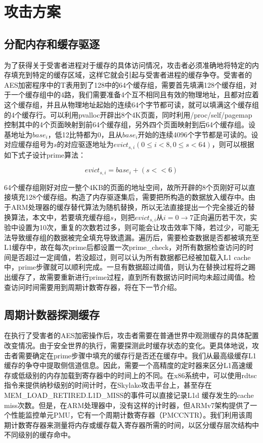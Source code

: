 \chapter{攻击方案}

\section{分配内存和缓存驱逐}
为了获得关于受害者进程对于缓存的具体访问情况，攻击者必须准确地将特定的内存填充到特定的缓存区域，这样它就会引起与受害者进程的缓存争夺。受害者的AES加密程序中的T表用到了128中的64个缓存组，需要首先填满128个缓存组，对于一个缓存组中的4路，我们需要准备4个互不相同且有效的物理地址，且都对应着这个缓存组，并且从物理地址起始的连续64个字节都可读，就可以填满这个缓存组的4个缓存行。可以利用pvalloc开辟出8个4K页面，同时利用/proc/self/pagemap控制其中的4个页面映射到前64个缓存组，另外四个页面映射到后64个缓存组。设基地址为$bas{e_i}$，低12比特都为0，且从$bas{e_i}$开始的连续4096个字节都是可读的。设对应缓存组号为$s$的对应驱逐地址为$evic{t_{s,i}}\left( {0 \le i < 8,0 \le s < 64} \right)$，则可以根据如下式子设计prime算法：

\begin{equation}
	evic{t_{s,i}} = bas{e_i} + \left( {s <  < 6} \right)
\end{equation}

64个缓存组刚好对应一整个4KB的页面的地址空间，故所开辟的8个页刚好可以直接填充128个缓存组。构造了内存驱逐集后，需要把所构造的数据放入缓存中。由于ARM处理器的缓存替代算法为随机替换，所以无法直接提出一个完全接近的替换算法，本文中，若要填充缓存组$s$，则把$evic{t_{s,i}}$从$i = 0\to 7$正向遍历若干次，实验中设置为10次，重复的次数若过多，则可能会让攻击效率下降，若过少，可能无法导致缓存组的数据被完全填充导致遗漏。遍历后，需要检查数据是否都被填充至L1缓存中，故在每次prime后都设置一次prime\_check，对所有数据检查访问的时间是否超过一定阈值，若没超过，则可以认为所有数据都已经被加载入L1 cache中，prime步骤就可以顺利完成。一旦有数据超过阈值，则认为在替换过程将之踢出缓存了，故需要重新进行prime过程，直到所有数据访问时间均未超过阈值。检查访问时间需要用到周期计数寄存器，将在下一节介绍。

\section{周期计数器探测缓存}



在执行了受害者的AES加密操作后，攻击者需要在普通世界中观测缓存的具体配置改变情况。由于安全世界的执行，需要探测此时缓存状态的变化。更具体地说，攻击者需要确定在prime步骤中填充的缓存行是否还在缓存中。我们从最高级缓存L1缓存的争夺中提取侧信道信息。因此，需要一个高精度的定时器来区分L1高速缓存或低级别的内存加载到寄存器中的时间上的不同。在x86系统中，可以使用rdtsc指令来提供纳秒级别的时间计时，在Skylake攻击平台上，甚至存在 MEM\_LOAD\_RETIRED.L1D\_MISS的事件可以直接记录L1d 缓存发生的cache miss次数。但是，在ARM处理器中，没有这样的计时器，但ARMv7架构提供了一个性能监控单元PMU，它有一个周期计数寄存器（PMCCNTR）。我们利用该周期计数寄存器来测量将内存或缓存载入寄存器所需的时间，以区分缓存层次结构中不同级别的缓存命中。

